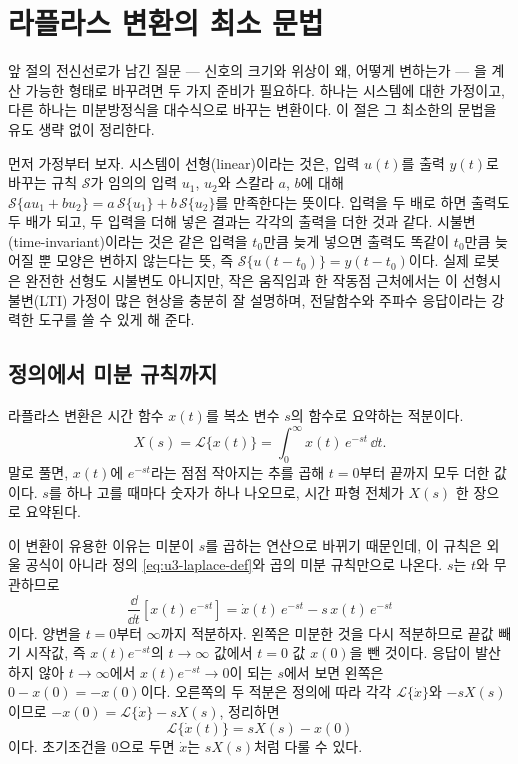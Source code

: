 \section{라플라스 변환의 최소 문법}
\label{sec:u3-laplace}

앞 절의 전신선로가 남긴 질문 --- 신호의 크기와 위상이 왜, 어떻게 변하는가 ---
을 계산 가능한 형태로 바꾸려면 두 가지 준비가 필요하다.
하나는 시스템에 대한 가정이고, 다른 하나는 미분방정식을 대수식으로 바꾸는
변환이다.
이 절은 그 최소한의 문법을 유도 생략 없이 정리한다.

먼저 가정부터 보자.
시스템이 선형(linear)이라는 것은, 입력 $u(t)$를 출력 $y(t)$로 바꾸는 규칙
$\mathcal{S}$가 임의의 입력 $u_1$, $u_2$와 스칼라 $a$, $b$에 대해
$\mathcal{S}\{a u_1 + b u_2\} = a\,\mathcal{S}\{u_1\} + b\,\mathcal{S}\{u_2\}$를
만족한다는 뜻이다.
입력을 두 배로 하면 출력도 두 배가 되고, 두 입력을 더해 넣은 결과는 각각의
출력을 더한 것과 같다.
시불변(time-invariant)이라는 것은 같은 입력을 $t_0$만큼 늦게 넣으면 출력도
똑같이 $t_0$만큼 늦어질 뿐 모양은 변하지 않는다는 뜻,
즉 $\mathcal{S}\{u(t-t_0)\} = y(t-t_0)$이다.
실제 로봇은 완전한 선형도 시불변도 아니지만, 작은 움직임과 한 작동점
근처에서는 이 선형시불변(LTI) 가정이 많은 현상을 충분히 잘 설명하며,
전달함수와 주파수 응답이라는 강력한 도구를 쓸 수 있게 해 준다.

\subsection{정의에서 미분 규칙까지}

라플라스 변환은 시간 함수 $x(t)$를 복소 변수 $s$의 함수로 요약하는 적분이다.
\begin{equation}
  X(s) = \mathcal{L}\{x(t)\}
  = \int_{0}^{\infty} x(t)\,e^{-st}\,\dd t.
  \label{eq:u3-laplace-def}
\end{equation}
말로 풀면, $x(t)$에 $e^{-st}$라는 점점 작아지는 추를 곱해 $t=0$부터 끝까지
모두 더한 값이다.
$s$를 하나 고를 때마다 숫자가 하나 나오므로, 시간 파형 전체가 $X(s)$ 한
장으로 요약된다.

이 변환이 유용한 이유는 미분이 $s$를 곱하는 연산으로 바뀌기 때문인데,
이 규칙은 외울 공식이 아니라 정의 \eqref{eq:u3-laplace-def}와 곱의 미분
규칙만으로 나온다.
$s$는 $t$와 무관하므로
\begin{equation}
  \frac{\dd}{\dd t}\left[x(t)\,e^{-st}\right]
  = \dot{x}(t)\,e^{-st} - s\,x(t)\,e^{-st}
\end{equation}
이다.
양변을 $t=0$부터 $\infty$까지 적분하자.
왼쪽은 미분한 것을 다시 적분하므로 끝값 빼기 시작값,
즉 $x(t)e^{-st}$의 $t\to\infty$ 값에서 $t=0$ 값 $x(0)$을 뺀 것이다.
응답이 발산하지 않아 $t\to\infty$에서 $x(t)e^{-st}\to 0$이 되는 $s$에서 보면
왼쪽은 $0 - x(0) = -x(0)$이다.
오른쪽의 두 적분은 정의에 따라 각각 $\mathcal{L}\{\dot{x}\}$와 $-sX(s)$이므로
$-x(0) = \mathcal{L}\{\dot{x}\} - sX(s)$, 정리하면
\begin{equation}
  \mathcal{L}\{\dot{x}(t)\} = sX(s) - x(0)
  \label{eq:u3-deriv-rule}
\end{equation}
이다.
초기조건을 0으로 두면 $\dot{x}$는 $sX(s)$처럼 다룰 수 있다.

